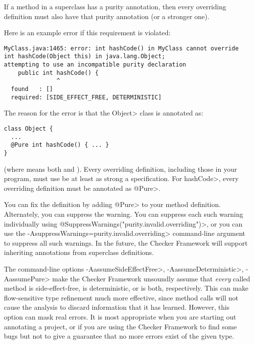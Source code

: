 
If a method in a superclass has a purity annotation, then every overriding
definition must also have that purity annotation (or a stronger one).

Here is an example error if this requirement is violated:

\begin{mysmall}
\begin{Verbatim}
MyClass.java:1465: error: int hashCode() in MyClass cannot override int hashCode(Object this) in java.lang.Object;
attempting to use an incompatible purity declaration
    public int hashCode() {
               ^
  found   : []
  required: [SIDE_EFFECT_FREE, DETERMINISTIC]
\end{Verbatim}
\end{mysmall}

\noindent
The reason for the error is that the \<Object> class is annotated as:

\begin{Verbatim}
class Object {
  ...
  @Pure int hashCode() { ... }
}
\end{Verbatim}

\noindent
(where  means both
 and
).  Every overriding
definition, including those in your program, must use be at least as strong
a specification.  For \<hashCode>, every overriding definition must be
annotated as \<@Pure>.

You can fix the definition by adding \<@Pure> to your method definition.
Alternately, you can suppress the warning.
You can suppress each such warning individually using
\<@SuppressWarnings("purity.invalid.overriding")>,
or you can use the \<-AsuppressWarnings=purity.invalid.overriding>
command-line argument to suppress all such warnings.
In the future, the Checker Framework will support inheriting annotations
from superclass definitions.



The command-line options \<-AassumeSideEffectFree>,
\<-AassumeDeterministic>, \<-AassumePure> make the Checker Framework unsoundly
assume that \emph{every} called method is side-effect-free, is
deterministic, or is both, respectively.  This can make
flow-sensitive type refinement much more effective, since method calls will
not cause the analysis to discard information that it has learned.
However, this option can mask real errors.  It is most appropriate when you
are starting out annotating a project, or if you are using the Checker
Framework to find some bugs but not to give a guarantee that no more errors
exist of the given type.

